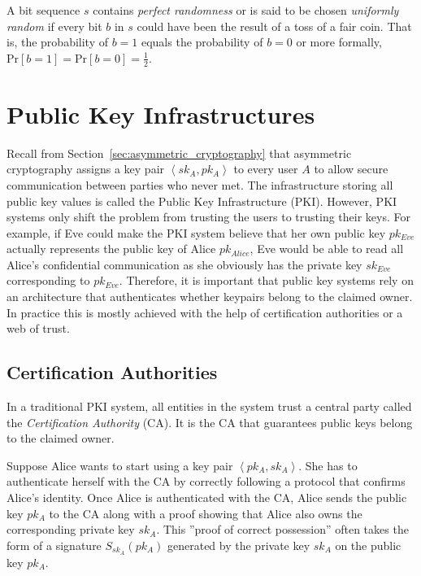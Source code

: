 \begin{defn}
\label{def:perfect_randomness}
 A bit sequence $s$ contains \textit{perfect randomness} or is said to be chosen \textit{uniformly random} if every bit $b$ in $s$ could have been the result of a toss of a fair coin. That is, the probability of $b = 1$ equals the probability of $b = 0$ or more formally, $\textrm{Pr} \left[ b = 1 \right] = \textrm{Pr} \left[ b = 0 \right] = \frac{1}{2}$.
\end{defn}

\section{Public Key Infrastructures}
Recall from Section~\ref{sec:asymmetric_cryptography} that asymmetric cryptography assigns a key pair $\left< sk_A, pk_A \right>$ to every user $A$ to allow secure communication between parties who never met. The infrastructure storing all public key values is called the Public Key Infrastructure (PKI). However, PKI systems only shift the problem from trusting the users to trusting their keys. For example, if Eve could make the PKI system believe that her own public key $pk_{Eve}$ actually represents the public key of Alice $pk_{Alice}$, Eve would be able to read all Alice's confidential communication as she obviously has the private key $sk_{Eve}$ corresponding to $pk_{Eve}$. Therefore, it is important that public key systems rely on an architecture that authenticates whether keypairs belong to the claimed owner. In practice this is mostly achieved with the help of certification authorities or a web of trust.

\subsection{Certification Authorities}
In a traditional PKI system, all entities in the system trust a central party called the \textit{Certification Authority} (CA). It is the CA that guarantees public keys belong to the claimed owner.

Suppose Alice wants to start using a key pair $\left< pk_A, sk_A \right>$. She has to authenticate herself with the CA by correctly following a protocol that confirms Alice's identity. Once Alice is authenticated with the CA, Alice sends the public key $pk_A$ to the CA along with a proof showing that Alice also owns the corresponding private key $sk_A$. This ''proof of correct possession'' often takes the form of a signature $S_{sk_A} \left( pk_A \right)$ generated by the private key $sk_A$ on the public key $pk_A$.

